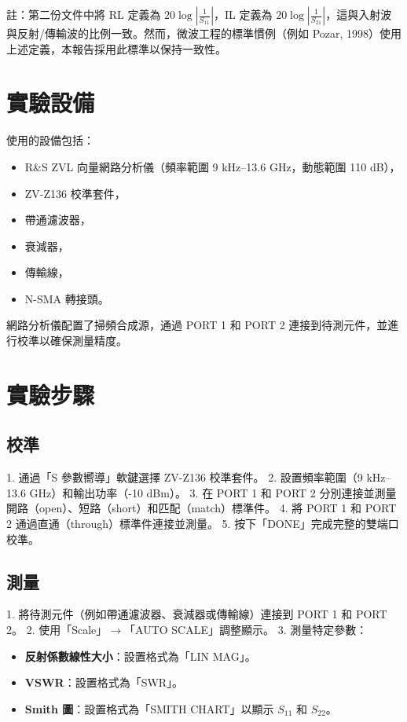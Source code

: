 \documentclass[ paper=a4paper, 12pt]{article}
\begin{document}
註：第二份文件中將 RL 定義為 \(20 \log \left| \frac{1}{S_{11}} \right|\)，IL 定義為 \(20 \log \left| \frac{1}{S_{21}} \right|\)，這與入射波與反射/傳輸波的比例一致。然而，微波工程的標準慣例（例如 Pozar, 1998）使用上述定義，本報告採用此標準以保持一致性。

\section{實驗設備}
使用的設備包括：
\begin{itemize}
\item R\&S ZVL 向量網路分析儀（頻率範圍 9 kHz–13.6 GHz，動態範圍 110 dB），
\item ZV-Z136 校準套件，
\item 帶通濾波器，
\item 衰減器，
\item 傳輸線，
\item N-SMA 轉接頭。
\end{itemize}


網路分析儀配置了掃頻合成源，通過 PORT 1 和 PORT 2 連接到待測元件，並進行校準以確保測量精度。

\section{實驗步驟}
\subsection{校準}
1. 通過「S 參數嚮導」軟鍵選擇 ZV-Z136 校準套件。
2. 設置頻率範圍（9 kHz–13.6 GHz）和輸出功率（-10 dBm）。
3. 在 PORT 1 和 PORT 2 分別連接並測量開路（open）、短路（short）和匹配（match）標準件。
4. 將 PORT 1 和 PORT 2 通過直通（through）標準件連接並測量。
5. 按下「DONE」完成完整的雙端口校準。

\subsection{測量}
1. 將待測元件（例如帶通濾波器、衰減器或傳輸線）連接到 PORT 1 和 PORT 2。
2. 使用「Scale」\(\rightarrow\)「AUTO SCALE」調整顯示。
3. 測量特定參數：
    \begin{itemize}
        \item \textbf{反射係數線性大小}：設置格式為「LIN MAG」。
   \item \textbf{VSWR}：設置格式為「SWR」。
   \item \textbf{Smith 圖}：設置格式為「SMITH CHART」以顯示 \(S_{11}\) 和 \(S_{22}\)。
    \end{itemize}
\end{document}
